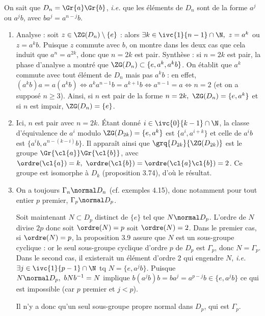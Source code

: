 On sait que $D_n = \Gr{a}\Gr{b}$, \emph{i.e.} que les éléments de $D_n$ sont de la forme $a^j$ ou $a^jb$, avec $ba^j = a^{n-j}b$.


\begin{enumerate}
    \item Analyse : soit $z\in \ZG(D_n) \setminus \{e\}$ : alors $\exists k\in \ivc{1}{n-1}\cap \N,~ z = a^k$ ou $z=a^kb$. Puisque $z$ commute avec $b$, on
     montre dans les deux cas que cela induit que $a^n = a^{2k}$, donc que $n=2k$ est pair. Synthèse : si $n=2k$ est pair, la phase d'analyse a montré que $\ZG(D_n) \subset \{e, a^k, a^kb\}$. On établit que $a^k$ commute avec
     tout élément de $D_n$ mais pas $a^kb$ : en effet, $(a^kb)a = a(a^kb) \iff a^k a^{n-1}b = a^{k+1}b \iff a^{n-1} = a \iff n = 2$ (et on a supposé $n\geq 3$). Ainsi, si $n$ est pair de la forme $n=2k,~ \ZG(D_n) = \{e, a^k\}$ et si $n$ est impair, $\ZG(D_n) = \{e\}$.
     \item Ici, $n$ est pair avec $n= 2k$. Étant donné $i \in \ivc{0}{k-1}\cap \N$, la classe d'équivalence de $a^i$ modulo $\ZG(D_{2k})=\{e, a^k\}$ 
     est $\{a^i, a^{i+k}\}$ et celle de $a^ib$ est $\{a^ib, a^{n-(k-i)}b\}$. Il apparaît ainsi que $\grq{D_{2k}}{\ZG(D_{2k})}$ est le groupe 
     $\Gr{\cl{a}}\Gr{\cl{b}}$, avec $\ordre(\cl{a}) = k,~ \ordre(\cl{b})=\ordre(\cl{a}\cl{b}) =2$. Ce groupe est isomorphe à $D_k$ (proposition 3.74), d'où le résultat.
     \item On a toujours $\Gamma_n \normal D_n$ (cf. exemples 4.15), donc notamment pour tout entier $p$ premier, $\Gamma_p \normal D_p$.
     
     Soit maintenant $N\subset D_p$ distinct de $\{e\}$ tel que $N\normal D_p$. L'ordre de $N$ divise $2p$ donc soit $\ordre(N)=p$ soit $\ordre(N)=2$. 
     Dans le premier cas, si $\ordre(N)=p$, la proposition 3.9 assure que $N$ est un sous-groupe cyclique : or le seul sous-groupe cyclique d'ordre $p$ de $D_p$ est $\Gamma_p$, donc 
     $N=\Gamma_p$. Dans le second cas, il existerait un élément d'ordre 2 qui engendre $N$, \emph{i.e.} $\exists j\in \ivc{1}{p-1}\cap \N$ tq $N=\{e, a^jb\}$. Puisque $N\normal D_p,~ bNb^{-1} = N$ implique
     $b(a^jb)b = ba^j = a^{p-j}b \in \{e, a^jb\}$ ce qui est impossible (car $p$ premier et $j<p$). 

     Il n'y a donc qu'un seul sous-groupe propre normal dans $D_p$, qui est $\Gamma_p$.
    \end{enumerate}
